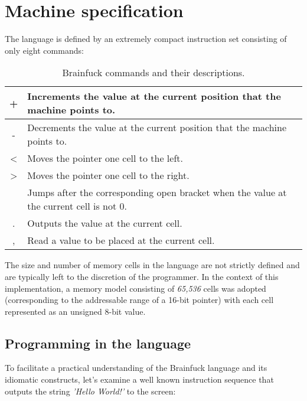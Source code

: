 \section{Machine specification}
\label{sec:ch2sec1}

\par The language is defined by an extremely compact instruction set consisting of only eight commands:

\begin{table}[H]
\centering
\begin{tabularx}{\textwidth}{| c | Y |}
\hline
+ & Increments the value at the current position that the machine points to. \\ \hline
- & Decrements the value at the current position that the machine points to. \\ \hline
\textless & Moves the pointer one cell to the left.                                  \\ \hline
\textgreater & Moves the pointer one cell to the right.                                 \\  & Jumps after the corresponding open bracket when the value at the current cell is not 0.   \\ \hline
. & Outputs the value at the current cell. \\ \hline
, & Read a value to be placed at the current cell. \\ \hline
\end{tabularx}
\caption{Brainfuck commands and their descriptions.\cite{BFWiki}}
\end{table}

\par The size and number of memory cells in the language are not strictly defined and are typically left to the discretion of the programmer. In the context of this implementation, a memory model consisting of \textit{65,536} cells was adopted (corresponding to the addressable range of a 16-bit pointer) with each cell represented as an unsigned 8-bit value.

\subsection{Programming in the language}
\label{sec:ch2sec1sub1}

\par To facilitate a practical understanding of the Brainfuck language and its idiomatic constructs, let's examine a well known instruction sequence that outputs the string \textit{'Hello World!'} to the screen:

